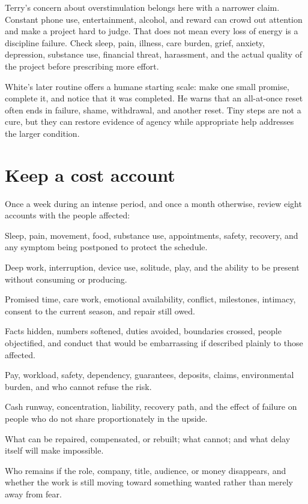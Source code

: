 Terry's concern about overstimulation belongs here with a narrower claim.
Constant phone use, entertainment, alcohol, and reward can crowd out attention
and make a project hard to judge. That does not mean every loss of energy is a
discipline failure. Check sleep, pain, illness, care burden, grief, anxiety,
depression, substance use, financial threat, harassment, and the actual quality
of the project before prescribing more effort.

White's later routine offers a humane starting scale: make one small promise,
complete it, and notice that it was completed. He warns that an all-at-once
reset often ends in failure, shame, withdrawal, and another reset. Tiny steps
are not a cure, but they can restore evidence of agency while appropriate help
addresses the larger condition.

\section{Keep a cost account}

Once a week during an intense period, and once a month otherwise, review eight
accounts with the people affected:

\begin{description}[leftmargin=2.8em,style=nextline]
\item[Body] Sleep, pain, movement, food, substance use, appointments, safety,
  recovery, and any symptom being postponed to protect the schedule.
\item[Attention] Deep work, interruption, device use, solitude, play, and the
  ability to be present without consuming or producing.
\item[Close people] Promised time, care work, emotional availability, conflict,
  milestones, intimacy, consent to the current season, and repair still owed.
\item[Integrity] Facts hidden, numbers softened, duties avoided, boundaries
  crossed, people objectified, and conduct that would be embarrassing if
  described plainly to those affected.
\item[Other people's exposure] Pay, workload, safety, dependency, guarantees,
  deposits, claims, environmental burden, and who cannot refuse the risk.
\item[Downside] Cash runway, concentration, liability, recovery path, and the
  effect of failure on people who do not share proportionately in the upside.
\item[Reversibility] What can be repaired, compensated, or rebuilt; what
  cannot; and what delay itself will make impossible.
\item[Identity and desire] Who remains if the role, company, title, audience,
  or money disappears, and whether the work is still moving toward something
  wanted rather than merely away from fear.
\end{description}

